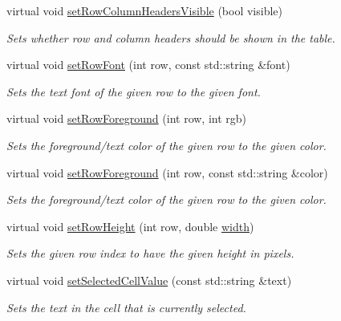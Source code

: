 \begin{DoxyCompactItemize}
virtual void \mbox{\hyperlink{classsgl_1_1GTable_a0d4a1d2a58daff8c1984e31b21f93ea1}{set\+Row\+Column\+Headers\+Visible}} (bool visible)
\begin{DoxyCompactList}\small\item\em Sets whether row and column headers should be shown in the table. \end{DoxyCompactList}\item 
virtual void \mbox{\hyperlink{classsgl_1_1GTable_adaeccb3f3fd318185b8adc644aaca949}{set\+Row\+Font}} (int row, const std\+::string \&font)
\begin{DoxyCompactList}\small\item\em Sets the text font of the given row to the given font. \end{DoxyCompactList}\item 
virtual void \mbox{\hyperlink{classsgl_1_1GTable_abe6e1382d3d98a9479cf43ac204b0ee3}{set\+Row\+Foreground}} (int row, int rgb)
\begin{DoxyCompactList}\small\item\em Sets the foreground/text color of the given row to the given color. \end{DoxyCompactList}\item 
virtual void \mbox{\hyperlink{classsgl_1_1GTable_a27ede8127bd8889e3f71dfe152c1684d}{set\+Row\+Foreground}} (int row, const std\+::string \&color)
\begin{DoxyCompactList}\small\item\em Sets the foreground/text color of the given row to the given color. \end{DoxyCompactList}\item 
virtual void \mbox{\hyperlink{classsgl_1_1GTable_a815f0bed3e7a76d99b4a026808a555b3}{set\+Row\+Height}} (int row, double \mbox{\hyperlink{classsgl_1_1GTable_ad72663daf610f2a0833a2fc3d78e4fdf}{width}})
\begin{DoxyCompactList}\small\item\em Sets the given row index to have the given height in pixels. \end{DoxyCompactList}\item 
virtual void \mbox{\hyperlink{classsgl_1_1GTable_a3120b24ea5aaa17d8a7192742c00bcfb}{set\+Selected\+Cell\+Value}} (const std\+::string \&text)
\begin{DoxyCompactList}\small\item\em Sets the text in the cell that is currently selected. \end{DoxyCompactList}\item 

\end{DoxyCompactItemize}
